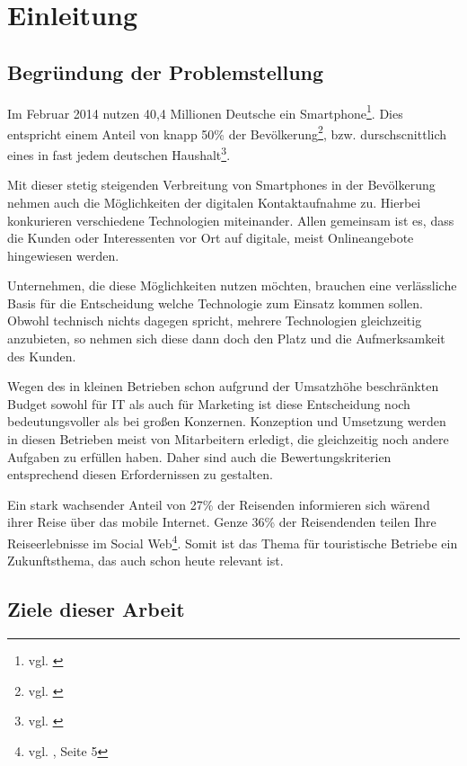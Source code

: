 \section{Einleitung}
\label{sec:einleitung}

\subsection{Begründung der Problemstellung}

Im Februar 2014 nutzen 40,4 Millionen Deutsche ein Smartphone\footnote{vgl. \cite{netzoekonom}}. Dies entspricht einem Anteil von knapp 50\% der Bevölkerung\footnote{vgl. \cite{destatis:bev}}, bzw. durschscnittlich eines in fast jedem deutschen Haushalt\footnote{vgl. \cite{destatis:hh}}. 

Mit dieser stetig steigenden Verbreitung von Smartphones in der Bevölkerung nehmen auch die Möglichkeiten der digitalen Kontaktaufnahme zu. 
Hierbei konkurieren verschiedene Technologien miteinander. Allen gemeinsam ist es, dass die Kunden oder Interessenten vor Ort auf digitale, meist Onlineangebote hingewiesen werden.

Unternehmen, die diese Möglichkeiten nutzen möchten, brauchen eine verlässliche Basis für die Entscheidung welche Technologie zum Einsatz kommen sollen. Obwohl technisch nichts dagegen spricht, mehrere Technologien gleichzeitig anzubieten, so nehmen sich diese dann doch den Platz und die Aufmerksamkeit des Kunden.

Wegen des in kleinen Betrieben schon aufgrund der Umsatzhöhe beschränkten Budget sowohl für IT als auch für Marketing ist diese Entscheidung noch bedeutungsvoller als bei großen Konzernen. Konzeption und Umsetzung werden in diesen Betrieben meist von Mitarbeitern erledigt, die gleichzeitig noch andere Aufgaben zu erfüllen haben. Daher sind auch die Bewertungskriterien entsprechend diesen Erfordernissen zu gestalten.

Ein stark wachsender Anteil von 27\% der Reisenden informieren sich wärend ihrer Reise über das mobile Internet. Genze 36\% der Reisendenden  teilen Ihre Reiseerlebnisse im Social Web\footnote{vgl. \cite{reiseanalyse}, Seite 5}. Somit ist das Thema für touristische Betriebe ein Zukunftsthema, das auch schon heute relevant ist.

\subsection{Ziele dieser Arbeit}


